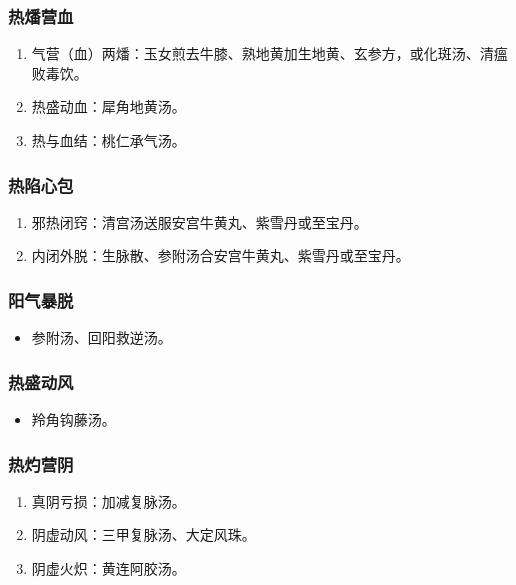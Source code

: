 \documentclass[cn,black,12pt,founder,normal,twocolumn]{elegantnote}
\begin{document}
\subsubsection{热燔营血}

\begin{enumerate}
    \item 气营（血）两燔：玉女煎去牛膝、熟地黄加生地黄、玄参方，或化斑汤、清瘟败毒饮。
    \item 热盛动血：犀角地黄汤。
    \item 热与血结：桃仁承气汤。
\end{enumerate}

\subsubsection{热陷心包}

\begin{enumerate}
    \item 邪热闭窍：清宫汤送服安宫牛黄丸、紫雪丹或至宝丹。
    \item 内闭外脱：生脉散、参附汤合安宫牛黄丸、紫雪丹或至宝丹。
\end{enumerate}

\subsubsection{阳气暴脱}

\begin{itemize}
    \item 参附汤、回阳救逆汤。
\end{itemize}

\subsubsection{热盛动风}

\begin{itemize}
    \item 羚角钩藤汤。
\end{itemize}

\subsubsection{热灼营阴}

\begin{enumerate}
    \item 真阴亏损：加减复脉汤。
    \item 阴虚动风：三甲复脉汤、大定风珠。
    \item 阴虚火炽：黄连阿胶汤。
\end{enumerate}
\end{document}
